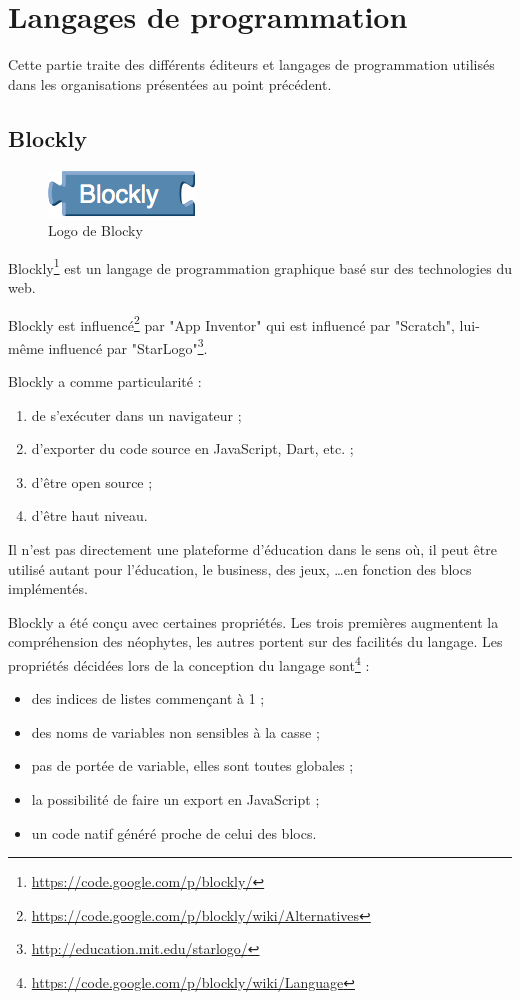 \section{Langages de programmation}
Cette partie traite des différents éditeurs et langages de programmation utilisés dans les organisations présentées au point précédent.
\subsection{Blockly}
\label{blockly}
\begin{figure}[!h]
  \begin{center}
    \includegraphics[scale=0.5]{content/5-related_work/images/blocky}
    \caption{Logo de Blocky}
    \label{fig:blocky}
  \end{center}
\end{figure}
Blockly\footnote{\url{https://code.google.com/p/blockly/}} est un langage de programmation graphique basé sur des technologies du web. 

Blockly est influencé\footnote{\url{https://code.google.com/p/blockly/wiki/Alternatives}} par "App Inventor" qui est influencé par "Scratch", lui-même influencé par "StarLogo"\footnote{\url{http://education.mit.edu/starlogo/}}.

Blockly a comme particularité :
\begin{enumerate}
\item de s'exécuter dans un navigateur ;
\item d'exporter du code source en JavaScript, Dart, etc. ;
\item d'être open source ;
\item d'être haut niveau.
\end{enumerate}

Il n'est pas directement une plateforme d'éducation dans le sens où, il peut être utilisé autant pour l'éducation, le business, des jeux, \ldots en fonction des blocs implémentés.

Blockly a été conçu avec certaines propriétés. Les trois premières augmentent la compréhension des néophytes, les autres portent sur des facilités du langage. Les propriétés décidées lors de la conception du langage sont\footnote{\url{https://code.google.com/p/blockly/wiki/Language}} :

\begin{itemize}
  \item des indices de listes commençant à 1 ;
  \item des noms de variables non sensibles à la casse ;
  \item pas de portée de variable, elles sont toutes globales ;
  \item la possibilité de faire un export en JavaScript ;
  \item un code natif généré proche de celui des blocs.
\end{itemize}


